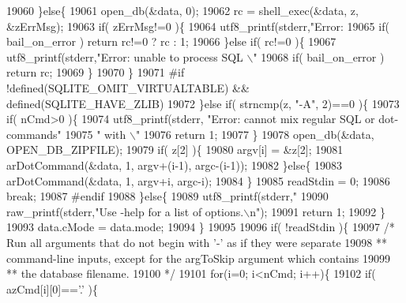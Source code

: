 \begin{DoxyCode}
{{{{{{{{19060       \}\textcolor{keywordflow}{else}\{
19061         open_db(&data, 0);
19062         rc = shell_exec(&data, z, &zErrMsg);
19063         \textcolor{keywordflow}{if}( zErrMsg!=0 )\{
19064           utf8_printf(stderr,\textcolor{stringliteral}{"Error: %
19065           \textcolor{keywordflow}{if}( bail_on_error ) \textcolor{keywordflow}{return} rc!=0 ? rc : 1;
19066         \}\textcolor{keywordflow}{else} \textcolor{keywordflow}{if}( rc!=0 )\{
19067           utf8_printf(stderr,\textcolor{stringliteral}{"Error: unable to process SQL \(\backslash\)"%
19068           \textcolor{keywordflow}{if}( bail_on_error ) \textcolor{keywordflow}{return} rc;
19069         \}
19070       \}
19071 \textcolor{preprocessor}{#if !defined(SQLITE\_OMIT\_VIRTUALTABLE) && defined(SQLITE\_HAVE\_ZLIB)}
19072     \}\textcolor{keywordflow}{else} \textcolor{keywordflow}{if}( strncmp(z, \textcolor{stringliteral}{"-A"}, 2)==0 )\{
19073       \textcolor{keywordflow}{if}( nCmd>0 )\{
19074         utf8_printf(stderr, \textcolor{stringliteral}{"Error: cannot mix regular SQL or dot-commands"}
19075                             \textcolor{stringliteral}{" with \(\backslash\)"%
19076         \textcolor{keywordflow}{return} 1;
19077       \}
19078       open_db(&data, OPEN_DB_ZIPFILE);
19079       \textcolor{keywordflow}{if}( z[2] )\{
19080         argv[i] = &z[2];
19081         arDotCommand(&data, 1, argv+(i-1), argc-(i-1));
19082       \}\textcolor{keywordflow}{else}\{
19083         arDotCommand(&data, 1, argv+i, argc-i);
19084       \}
19085       readStdin = 0;
19086       \textcolor{keywordflow}{break};
19087 \textcolor{preprocessor}{#endif}
19088     \}\textcolor{keywordflow}{else}\{
19089       utf8_printf(stderr,\textcolor{stringliteral}{"%
19090       raw_printf(stderr,\textcolor{stringliteral}{"Use -help for a list of options.\(\backslash\)n"});
19091       \textcolor{keywordflow}{return} 1;
19092     \}
19093     data.cMode = data.mode;
19094   \}
19095 
19096   \textcolor{keywordflow}{if}( !readStdin )\{
19097     \textcolor{comment}{/* Run all arguments that do not begin with '-' as if they were separate}
19098 \textcolor{comment}{    ** command-line inputs, except for the argToSkip argument which contains}
19099 \textcolor{comment}{    ** the database filename.}
19100 \textcolor{comment}{    */}
19101     \textcolor{keywordflow}{for}(i=0; i<nCmd; i++)\{
19102       \textcolor{keywordflow}{if}( azCmd[i][0]==\textcolor{charliteral}{'.'} )\{
}}}}}}}}}}}}
\end{DoxyCode}
